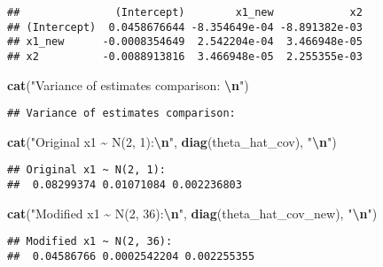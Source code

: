 \documentclass[
]{article}
\newenvironment{Shaded}{\begin{snugshade}}{\end{snugshade}}
\newcommand{\FunctionTok}[1]{\textcolor[rgb]{0.13,0.29,0.53}{\textbf{#1}}}
\newcommand{\NormalTok}[1]{#1}
\newcommand{\SpecialCharTok}[1]{\textcolor[rgb]{0.81,0.36,0.00}{\textbf{#1}}}
\newcommand{\StringTok}[1]{\textcolor[rgb]{0.31,0.60,0.02}{#1}}
\begin{document}
\begin{verbatim}
##               (Intercept)        x1_new            x2
## (Intercept)  0.0458676644 -8.354649e-04 -8.891382e-03
## x1_new      -0.0008354649  2.542204e-04  3.466948e-05
## x2          -0.0088913816  3.466948e-05  2.255355e-03
\end{verbatim}

\begin{Shaded}
\begin{Highlighting}[]
\FunctionTok{cat}\NormalTok{(}\StringTok{"Variance of estimates comparison: }\SpecialCharTok{\textbackslash{}n}\StringTok{"}\NormalTok{)}
\end{Highlighting}
\end{Shaded}

\begin{verbatim}
## Variance of estimates comparison:
\end{verbatim}

\begin{Shaded}
\begin{Highlighting}[]
\FunctionTok{cat}\NormalTok{(}\StringTok{"Original x1 \textasciitilde{} N(2, 1):}\SpecialCharTok{\textbackslash{}n}\StringTok{"}\NormalTok{, }\FunctionTok{diag}\NormalTok{(theta\_hat\_cov), }\StringTok{"}\SpecialCharTok{\textbackslash{}n}\StringTok{"}\NormalTok{)}
\end{Highlighting}
\end{Shaded}

\begin{verbatim}
## Original x1 ~ N(2, 1):
##  0.08299374 0.01071084 0.002236803
\end{verbatim}

\begin{Shaded}
\begin{Highlighting}[]
\FunctionTok{cat}\NormalTok{(}\StringTok{"Modified x1 \textasciitilde{} N(2, 36):}\SpecialCharTok{\textbackslash{}n}\StringTok{"}\NormalTok{, }\FunctionTok{diag}\NormalTok{(theta\_hat\_cov\_new), }\StringTok{"}\SpecialCharTok{\textbackslash{}n}\StringTok{"}\NormalTok{)}
\end{Highlighting}
\end{Shaded}

\begin{verbatim}
## Modified x1 ~ N(2, 36):
##  0.04586766 0.0002542204 0.002255355
\end{verbatim}
\end{document}
